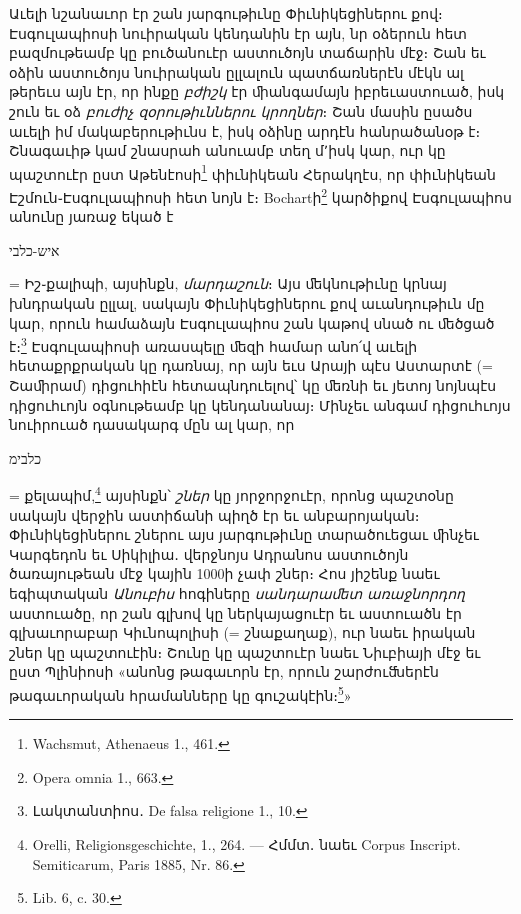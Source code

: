 \documentclass{article}
\begin{document}
{Աւելի նշանաւոր էր շան յարգութիւնը Փիւնիկեցիներու քով։ Էսգուլապիոսի նուիրական կենդանին էր այն, նր օձերուն հետ բազմութեամբ կը բուծանուէր աստուծոյն տաճարին մէջ։ Շան եւ օձին աստուծոյս նուիրական ըլլալուն պատճառներէն մէկն ալ թերեւս այն էր, որ ինքը \emph{բժիշկ} էր ﬕանգամայն իբրեւաստուած, իսկ շուն եւ օձ \emph{բուժիչ զօրութիւններու կրողներ}։ Շան մասին ըսածս աւելի իմ մակաբերութիւնս է, իսկ օձինը արդէն հանրածանօթ է։ Շնագաւիթ կամ շնասրահ անուամբ տեղ մ՚իսկ կար, ուր կը պաշտուէր ըստ Աթենէոսի\footnote{Wachsmut, Athenaeus 1., 461.} փիւնիկեան Հերակղէս, որ փիւնիկեան Էշմուն֊Էսգուլապիոսի հետ նոյն է։ Bochartի\footnote{Opera omnia 1., 663.} կարծիքով Էսգուլապիոս անունը յառաջ եկած է \begin{hebrewfont}איש-כלבי\end{hebrewfont} = Իշ֊քալիպի, այսինքն, \emph{մարդաշուն}։ Այս ﬔկնութիւնը կրնայ խնդրական ըլլալ, սակայն Փիւնիկեցիներու քով աւանդութիւն մը կար, որուն համաձայն Էսգուլապիոս շան կաթով սնած ու ﬔծցած է։\footnote{Լակտանտիոս․ De falsa religione 1., 10.} Էսգուլապիոսի առասպելը ﬔզի համար անո՛վ աւելի հետաքրքրական կը դառնայ, որ այն եւս Արայի պէս Աստարտէ (= Շաﬕրամ) դիցուհիէն հետապնդուելով՝ կը ﬔռնի եւ յետոյ նոյնպէս դիցուհւոյն օգնութեամբ կը կենդանանայ։ Մինչեւ անգամ դիցուհւոյս նուիրուած դասակարգ մըն ալ կար, որ \begin{hebrewfont}כלבימ\end{hebrewfont} = քելապիմ,\footnote{Orelli, Religionsgeschichte, 1., 264. — Հմմտ․ նաեւ Corpus Inscript. Semiticarum, Paris 1885, Nr. 86.} այսինքն՝ \emph{շներ} կը յորջորջուէր, որոնց պաշտօնը սակայն վերջին աստիճանի պիղծ էր եւ անբարոյական։ Փիւնիկեցիներու շներու այս յարգութիւնը տարածուեցաւ ﬕնչեւ Կարգեդոն եւ Սիկիլիա․ վերջնոյս Ադրանոս աստուծոյն ծառայութեան մէջ կային 1000ի չափ շներ։ Հոս յիշենք նաեւ եգիպտական \emph{Անուբիս} հոգիները \emph{սանդարաﬔտ առաջնորդող} աստուածը, որ շան գլխով կը ներկայացուէր եւ աստուածն էր գլխաւորաբար Կիւնոպոլիսի (= շնաքաղաք), ուր նաեւ իրական շներ կը պաշտուէին։ Շունը կը պաշտուէր նաեւ Նիւբիայի մէջ եւ ըստ Պլինիոսի «անոնց թագաւորն էր, որուն շարժուﬓերէն թագաւորական հրամանները կը գուշակէին։\footnote{Lib. 6, c. 30.}»

}
\end{document}
